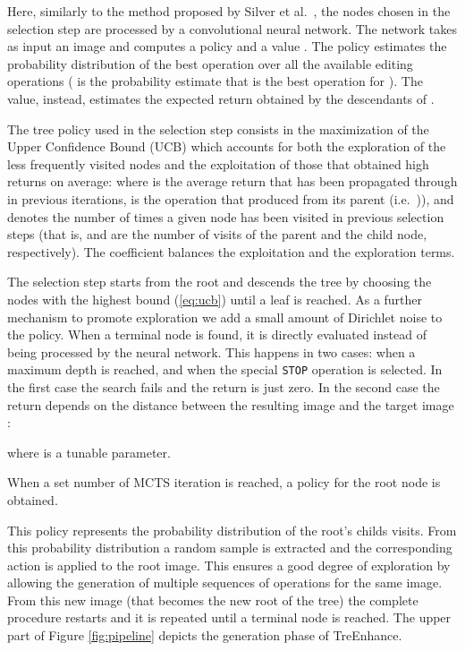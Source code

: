 \documentclass[3p,twocolumn]{elsarticle}
\newcommand{\method}[0]{TreEnhance}
\begin{document}
Here, similarly to the method proposed by Silver et al.~\cite{silver2018masteringzero}, the nodes chosen in the selection step are processed by a convolutional neural network.
The network takes as input an image  and computes a policy  and a value .
The policy estimates the probability distribution of the best operation over all the available editing operations ( is the probability estimate that  is the best operation for ).
The value, instead, estimates the expected return  obtained by the descendants of .

The tree policy used in the selection step consists in the maximization of the Upper Confidence Bound (UCB) which accounts for both the exploration of the less frequently visited nodes and the exploitation of those that obtained high returns on average:  
where  is the average return that has been propagated through  in previous iterations,  is the operation that produced  from its parent  (i.e.~)), and  denotes the number of times a given node has been visited in previous selection steps (that is,  and  are the number of visits of the parent and the child node, respectively).
The coefficient  balances the exploitation and the exploration terms.

The selection step starts from the root and descends the tree by choosing the nodes with the highest bound (\ref{eq:ucb}) until a leaf is reached.
As a further mechanism to promote exploration we add a small amount of Dirichlet noise to the policy.
When a terminal node is found, it is directly evaluated instead of being processed by the neural network.  This happens in two cases: when a maximum depth is reached, and when the special \texttt{STOP} operation is selected.
In the first case the search fails and the return is just zero.
In the second case the return depends on the distance between the resulting image  and the target image :

where  is a tunable parameter.

When a set number of MCTS iteration is reached, a policy  for the root node is obtained.

This policy represents the probability distribution of the root's childs visits. From this probability distribution a random sample is extracted and the corresponding action is applied to the root image. This ensures a good degree of exploration by allowing the generation of multiple sequences of operations for the same image. From this new image (that becomes the new root of the tree) the complete procedure restarts and it is repeated until a terminal node is reached. The upper part of Figure \ref{fig:pipeline} depicts the generation phase of \method{}.
\end{document}
